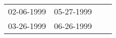 \begin{supertabular}{llll}
 02-06-1999 &  05-27-1999 \\
 03-26-1999 &  06-26-1999 \\
\end{supertabular}
